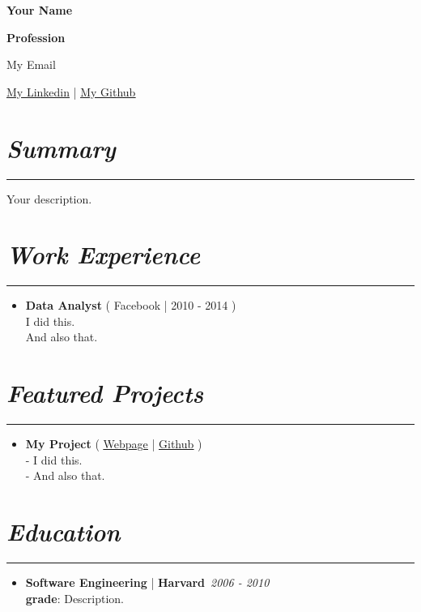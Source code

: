 \documentclass[11pt,a4paper]{article}
\newcommand{\customsection}[1]{
    \section*{{{\textbf{\textit{#1}}}}}

    \vspace{-2em}
    \rule{\textwidth}{0.4pt}

}
\begin{document}
\pagestyle{empty}

\centerline{\textbf{\Huge Your Name}}

\bigskip

\centerline{\textbf{\Large Profession}}

\bigskip

\centerline{\faEnvelope \hspace{0.1cm} {My Email}}\vspace{0.3em}
\centerline{\faLinkedin \hspace{0.1cm} \href{https://www.linkedin.com/in/example/}{\underline{My Linkedin}} | \faGithub \hspace{0.1cm} \href{https://github.com/example}{\underline{My Github}}}\vspace{0.3em}

\customsection{Summary}

\vspace{1.5em}

Your description.

\customsection{Work Experience}

\begin{itemize}[leftmargin=*]
	\item \textbf{Data Analyst} ( \faInstitution \hspace{0.05cm} Facebook | \faCalendar \hspace{0.1cm} 2010 - 2014 )\vspace{0.5em} \\
I did this. \\
	And also that.
\end{itemize}

\customsection{Featured Projects}

\begin{itemize}[label=$\bullet$, leftmargin=*]
	\item \textbf{My Project} ( \faGlobe \hspace{0.1cm} \href{https://www.mypage.com/example/}{\underline{Webpage}}  | \faGithub \hspace{0.1cm} \href{https://github.com/name/myproject}{\underline{Github}} )\vspace{0.5em} \\
	- I did this. \\
	- And also that.
\end{itemize}

\customsection{Education}

\begin{itemize}[label=$\bullet$, leftmargin=*]
\item \textbf{Software Engineering} | \textbf{Harvard}\hfill \faCalendar\ \textit{2006 - 2010} \\[10pt]\textbf{grade}: Description.
\end{itemize}
\end{document}
